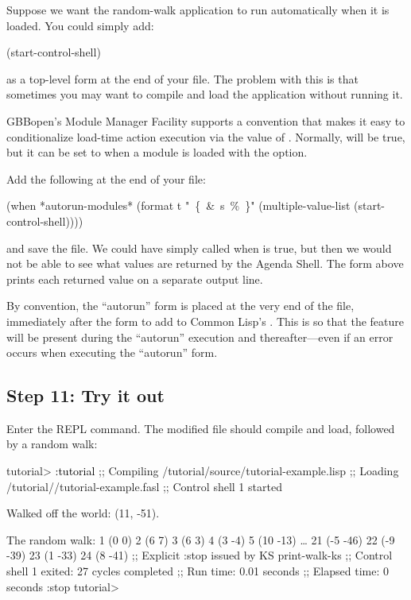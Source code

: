 \documentclass[10pt,twoside,english,pdftex]{article}
\begin{document}
Suppose we want the random-walk application to run automatically when it is
loaded.  You could simply add:
% 
\W\supp
\begin{example}
\textcolor{darkergray}{%
  (start-control-shell)}
\end{example}
%
as a top-level form at the end of your 
file.  The problem with this is that sometimes you may want to compile and
load the application without running it.

GBBopen's Module Manager Facility supports a convention that makes it easy to
conditionalize load-time action execution via the value of
.  Normally,
 will be true, but it can be set to \nil{}
when a module is loaded with the  option.

Add the following at the end of your  file:
% 
\W\supp
\begin{example}
  (when *autorun-modules* 
    (format t "~\{~\&~s~\%~\}" (multiple-value-list (start-control-shell))))
\end{example}
%
and save the file.  We could have simply called
 when  is
true, but then we would not be able to see what values are returned by the
Agenda Shell.  The  form above prints each returned value on a
separate output line.

By convention, the ``autorun'' form is placed at the very end of the file,
immediately after the form to add  to Common Lisp's
.  This is so that the  feature will be
present during the ``autorun'' execution and thereafter---even if an error
occurs when executing the ``autorun'' form.

\subsection*{Step 11: Try it out}

Enter the  REPL command. The modified
 file should compile and load, followed by
a random walk:
%
\W\supp
\begin{smallexample}
\textcolor{darkergray}{%
  tutorial> \textcolor{black}{:tutorial}
  ;; Compiling /tutorial/source/tutorial-example.lisp
  ;; Loading /tutorial//tutorial-example.fasl
  ;; Control shell 1 started

  Walked off the world: (11, -51).

  The random walk:
  1 (0 0)
  2 (6 7)
  3 (6 3)
  4 (3 -4)
  5 (10 -13)
     \textrm{\ldots{}}
  21 (-5 -46)
  22 (-9 -39)
  23 (1 -33)
  24 (8 -41)
  ;; Explicit :stop issued by KS print-walk-ks
  ;; Control shell 1 exited: 27 cycles completed
  ;; Run time: 0.01 seconds
  ;; Elapsed time: 0 seconds
  :stop
  tutorial>}
\end{smallexample}
\end{document}
